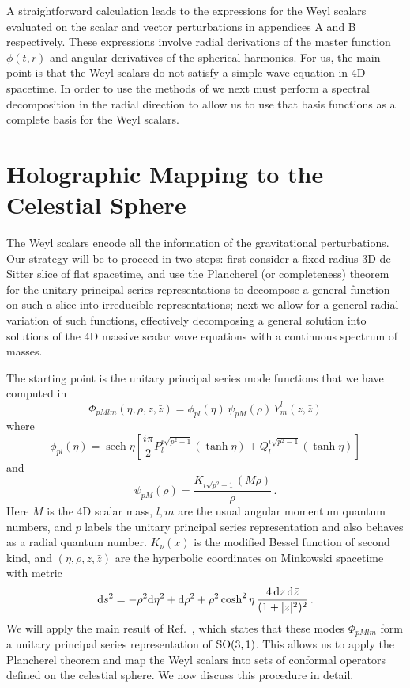 \documentclass{brownthesis}
\DeclareMathOperator{\sech}{sech}
\def\dd{{\rm d}}
\begin{document}
A straightforward calculation leads to the expressions for the Weyl
scalars evaluated on the scalar and vector perturbations in appendices
A and B respectively. These expressions involve radial derivations
of the master function $\phi(t,r)$ and angular derivatives of the
spherical harmonics. For us, the main point is that the Weyl scalars
do not satisfy a simple wave equation in 4D spacetime. In order to
use the methods of \cite{Liu:2021tif} we next must perform a spectral
decomposition in the radial direction to allow us to use that basis
functions as a complete basis for the Weyl scalars.

\section{Holographic Mapping to the Celestial Sphere}

The Weyl scalars encode all the information of the gravitational perturbations.
Our strategy will be to proceed in two steps: first consider a fixed
radius 3D de Sitter slice of flat spacetime, and use the Plancherel
(or completeness) theorem for the unitary principal series representations
to decompose a general function on such a slice into irreducible representations;
next we allow for a general radial variation of such functions, effectively
decomposing a general solution into solutions of the 4D massive scalar
wave equations with a continuous spectrum of masses.

The starting point is the unitary principal series mode functions
that we have computed in \cite{Liu:2021tif}
\[
\Phi_{pMlm}(\eta,\rho,z,\bar{z})=\phi_{pl}(\eta)\,\psi_{pM}(\rho)\,Y_{m}^{l}(z,\bar{z})
\]
where
\[
\phi_{pl}(\eta)=\sech\eta\left[\frac{i\pi}{2}P_{l}^{i\sqrt{p^{2}-1}}\left(\tanh\eta\right)+Q_{l}^{i\sqrt{p^{2}-1}}\left(\tanh\eta\right)\right]
\]
and
\[
\psi_{pM}(\rho)=\frac{K_{i\sqrt{p^{2}-1}}(M\rho)}{\rho}\,.
\]
Here $M$ is the 4D scalar mass, $l,m$ are the usual angular momentum
quantum numbers, and $p$ labels the unitary principal series representation
and also behaves as a radial quantum number. $K_{\nu}(x)$ is the
modified Bessel function of second kind, and $(\eta,\rho,z,\bar{z})$
are the hyperbolic coordinates on Minkowski spacetime with metric
\[
\dd s^{2}=-\rho^{2}\dd\eta^{2}+\dd\rho^{2}+\rho^{2}\cosh^{2}\eta\,\frac{4\,\dd z\,\dd\bar{z}}{(1+|z|^{2})^{2}}\,.
\]
We will apply the main result of Ref.~\cite{Liu:2021tif}, which
states that these modes $\Phi_{pMlm}$ form a unitary principal series
representation of ${\rm SO(3,1)}$. This allows us to apply the Plancherel
theorem \cite{knapp2001representation} and map the Weyl scalars into
sets of conformal operators defined on the celestial sphere. We now
discuss this procedure in detail.
\end{document}
